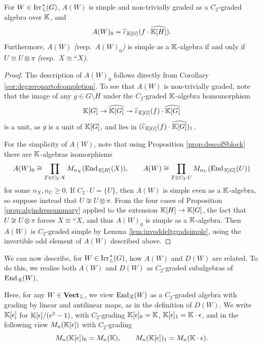 \begin{lemma}\label{lem:basicpropertiesAW}
    For $W \in \operatorname{Irr}_{\, {\mathbb L}}^{\hspace{0.1em} \star}(G)$, $A(W)$ is simple and non-trivially graded as a $C_2$-graded algebra over ${\mathbb K}$, and
    \[
        A(W)_0 = \widehat{\iota}_{\, {\mathbb K}[G]}(f \cdot \widehat{{\mathbb K}[H]}).
    \]
    Furthermore, $A(W)$ \emph{(}resp.\ $A(W)_0$\emph{)} is simple as a ${\mathbb K}$-algebra if and only if $U \cong U \otimes \pi$ \emph{(}resp.\ $X \cong {}^{\omega}X$\emph{)}.
\end{lemma}

\begin{proof}
    The description of $A(W)_0$ follows directly from Corollary \ref{cor:degzeropartofcompletion}. To see that $A(W)$ is non-trivially graded, note that the image of any $g \in G \setminus H$ under the $C_2$-graded ${\mathbb K}$-algebra homomorphism 
    \[
    {\mathbb K}[G] \rightarrow \widehat{{\mathbb K}[G]} \twoheadrightarrow \widehat{\iota}_{\, {\mathbb K}[G]}(f) \cdot \widehat{{\mathbb K}[G]}
    \]
    is a unit, as $g$ is a unit of ${\mathbb K}[G]$, and lies in $(\widehat{\iota}_{\, {\mathbb K}[G]}(f) \cdot \widehat{{\mathbb K}[G]})_1$. 

    For the simplicity of $A(W)$, note that using Proposition \ref{prop:descofSblock} there are ${\mathbb K}$-algebras isomorphisms
        \[
            A(W)_0 \cong \prod_{T \in C_2 \cdot X} M_{n_X}(\operatorname{End}_{\, {\mathbb K}[H]}(X)), \qquad A(W) \cong \prod_{T \in C_2 \cdot U} M_{n_U}(\operatorname{End}_{\, {\mathbb K}[G]}(U))
        \]
        for some $n_X, n_U \geq 0$. If $C_2 \cdot U = \{U\}$, then $A(W)$ is simple even as a ${\mathbb K}$-algebra, so suppose instead that $U \not\cong U \otimes \pi$. From the four cases of Proposition \ref{prop:algindressummary} applied to the extension ${\mathbb K}[H] \rightarrow {\mathbb K}[G]$, the fact that $U \not\cong U \otimes \pi$ forces $X \cong {}^{\omega}X$, and thus $A(W)_0$ is simple as a ${\mathbb K}$-algebra. Then $A(W)$ is $C_2$-graded simple by Lemma \ref{lem:invoddeltgradsimple}, using the invertible odd element of $A(W)$ described above.
\end{proof}

We can now describe, for $W \in \operatorname{Irr}_{\, {\mathbb L}}^{\hspace{0.1em} \star}(G)$, how $A(W)$ and $D(W)$ are related. To do this, we realise both $A(W)$ and $D(W)$ as $C_2$-graded subalgebras of $\operatorname{End}_{\, {\mathbb K}}(W)$.

Here, for any $W \in \operatorname{\mathbf{Vect}}_{\, {\mathbb L}}$, we view $\operatorname{End}_{\, {\mathbb K}}(W)$ as a $C_2$-graded algebra with grading by linear and antilinear maps, as in the definition of $D(W)$. We write ${\mathbb K}[\epsilon]$ for ${\mathbb K}[\epsilon] / (\epsilon^2 - 1)$, with $C_2$-grading ${\mathbb K}[\epsilon]_0 = {\mathbb K}$, ${\mathbb K}[\epsilon]_1 = {\mathbb K} \cdot \epsilon$, and in the following view $M_{n}({\mathbb K}[\epsilon])$ with $C_2$-grading
\[
M_{n}({\mathbb K}[\epsilon])_0 = M_{n}({\mathbb K}), \qquad M_{n}({\mathbb K}[\epsilon])_1 = M_{n}({\mathbb K} \cdot \epsilon).
\]

